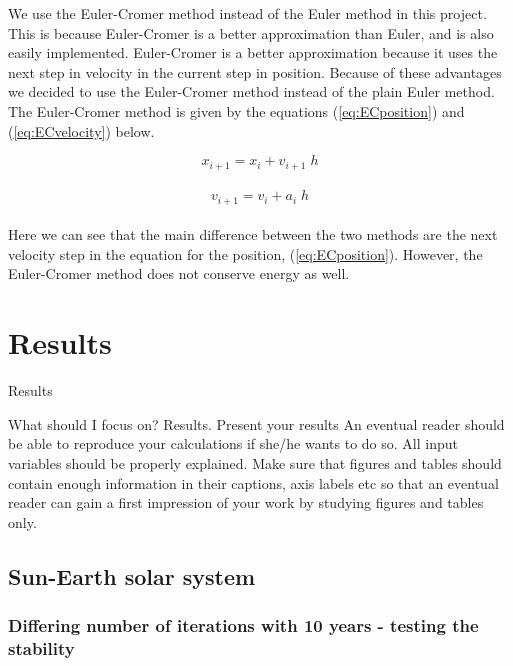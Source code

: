 \documentclass{article}
\begin{document}
    We use the Euler-Cromer method instead of the Euler method in this project. This is because Euler-Cromer is a better approximation than Euler, and is also easily implemented. Euler-Cromer is a better approximation because it uses the next step in velocity in the current step in position. Because of these advantages we decided to use the Euler-Cromer method instead of the plain Euler method. The Euler-Cromer method is given by the equations (\ref{eq:ECposition}) and (\ref{eq:ECvelocity}) below.

    \begin{equation}    \label{eq:ECposition}
        x_{i+1} = x_i + v_{i+1} \; h
    \end{equation} \\

    \begin{equation}    \label{eq:ECvelocity}
        v_{i+1} = v_i + a_i \; h
    \end{equation} \\

    Here we can see that the main difference between the two methods are the next velocity step in the equation for the position, (\ref{eq:ECposition}). However, the Euler-Cromer method does not conserve energy as well.



\vspace{1cm}

\section{Results} \label{sec:Results}

    Results

    What should I focus on? Results.
    Present your results
    An eventual reader should be able to reproduce your calculations if she/he wants to do so. All input variables should be properly explained.
    Make sure that figures and tables should contain enough information in their captions, axis labels etc so that an eventual reader can gain a first impression of your work by studying  figures and tables only.


\subsection{Sun-Earth solar system}

\subsubsection{Differing number of iterations with 10 years - testing the stability}
\end{document}
